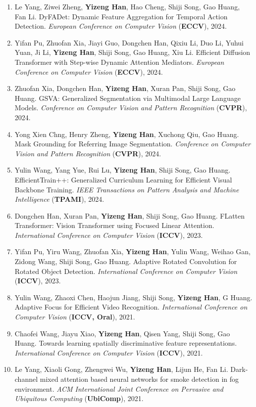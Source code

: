 \documentclass[10.5pt, UTF8]{ctexart}
\makeatletter
\newlength{\bibhang}
\newlength{\bibsep}
 {\@listi \global\bibsep\itemsep \global\advance\bibsep by\parsep}
\newenvironment{bibsection}%
        {\begin{enumerate}{%
       \setlength{\leftmargin}{-2em}%
       \setlength{\itemindent}{-2em}%
       \setlength{\itemsep}{\bibsep}%
        \setlength{\partopsep}{0pt}%
        \setlength{\topsep}{0pt}}}
        {\end{enumerate}\vspace{-.6\baselineskip}}
\makeatother
\begin{document}
\begin{sloppypar}
\begin{bibsection}
        \item Le Yang, Ziwei Zheng, \textbf{Yizeng Han}, Hao Cheng, Shiji Song, Gao Huang, Fan Li. DyFADet: Dynamic Feature Aggregation for Temporal Action Detection. \emph{European Conference on Computer Vision} (\textbf{ECCV}), 2024.
        \item Yifan Pu, Zhuofan Xia, Jiayi Guo, Dongchen Han, Qixiu Li, Duo Li, Yuhui Yuan, Ji Li, \textbf{Yizeng Han}, Shiji Song, Gao Huang, Xiu Li. Efficient Diffusion Transformer with Step-wise Dynamic Attention Mediators. \emph{European Conference on Computer Vision} (\textbf{ECCV}), 2024.
        \item Zhuofan Xia, Dongchen Han, \textbf{Yizeng Han}, Xuran Pan, Shiji Song, Gao Huang. GSVA: Generalized Segmentation via Multimodal Large Language Models. \emph{Conference on Computer Vision and Pattern Recognition} (\textbf{CVPR}), 2024.
        \item Yong Xien Chng, Henry Zheng, \textbf{Yizeng Han}, Xuchong Qiu, Gao Huang. Mask Grounding for Referring Image Segmentation. \emph{Conference on Computer Vision and Pattern Recognition} (\textbf{CVPR}), 2024.
        \item Yulin Wang, Yang Yue, Rui Lu, \textbf{Yizeng Han}, Shiji Song,  Gao Huang. EfficientTrain++: Generalized Curriculum Learning for Efficient Visual Backbone Training. \emph{IEEE Transactions on Pattern Analysis and Machine Intelligence} (\textbf{TPAMI}), 2024.
        \item Dongchen Han, Xuran Pan, \textbf{Yizeng Han}, Shiji Song, Gao Huang. FLatten Transformer: Vision Transformer using Focused Linear Attention. \emph{International Conference on Computer Vision} (\textbf{ICCV}), 2023.
        \item Yifan Pu, Yiru Wang, Zhuofan Xia, \textbf{Yizeng Han}, Yulin Wang, Weihao Gan, Zidong Wang, Shiji Song, Gao Huang. Adaptive Rotated Convolution for Rotated Object Detection. \emph{International Conference on Computer Vision} (\textbf{ICCV}), 2023.
        \item Yulin Wang, Zhaoxi Chen, Haojun Jiang, Shiji Song, \textbf{Yizeng Han}, G Huang. Adaptive Focus for Efficient Video Recognition. \emph{International Conference on Computer Vision} (\textbf{ICCV, Oral}), 2021.
        \item Chaofei Wang, Jiayu Xiao, \textbf{Yizeng Han}, Qisen Yang, Shiji Song, Gao Huang. Towards learning spatially discriminative feature representations. \emph{International Conference on Computer Vision} (\textbf{ICCV}), 2021.
        \item Le Yang, Xiaoli Gong, Zhengwei Wu, \textbf{Yizeng Han}, Lijun He, Fan Li. Dark-channel mixed attention based neural networks for smoke detection in fog environment. \emph{ACM International Joint Conference on Pervasive and Ubiquitous Computing} (\textbf{UbiComp}), 2021.

\end{bibsection}
\end{sloppypar}
\end{document}
